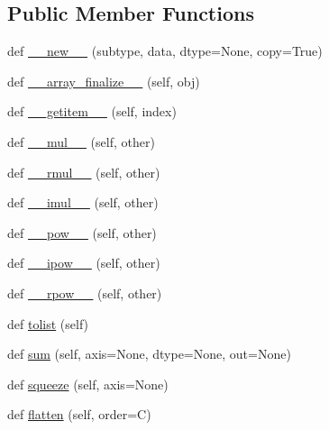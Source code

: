 \subsection*{Public Member Functions}
\begin{DoxyCompactItemize}
\item 
def \hyperlink{classnumpy_1_1matrixlib_1_1defmatrix_1_1matrix_ac27a960e1f347f1c668370b422168e2b}{\+\_\+\+\_\+new\+\_\+\+\_\+} (subtype, data, dtype=None, copy=True)
\item 
def \hyperlink{classnumpy_1_1matrixlib_1_1defmatrix_1_1matrix_a62da679c69d703e990df2a601d58d136}{\+\_\+\+\_\+array\+\_\+finalize\+\_\+\+\_\+} (self, obj)
\item 
def \hyperlink{classnumpy_1_1matrixlib_1_1defmatrix_1_1matrix_ac3c83aa69aecf2e2cb76154da9c4a88f}{\+\_\+\+\_\+getitem\+\_\+\+\_\+} (self, index)
\item 
def \hyperlink{classnumpy_1_1matrixlib_1_1defmatrix_1_1matrix_aa5b2cc49d1b2fda5e9806291892a1b87}{\+\_\+\+\_\+mul\+\_\+\+\_\+} (self, other)
\item 
def \hyperlink{classnumpy_1_1matrixlib_1_1defmatrix_1_1matrix_a9d6f3efe9eb68e1e26e29388434856bb}{\+\_\+\+\_\+rmul\+\_\+\+\_\+} (self, other)
\item 
def \hyperlink{classnumpy_1_1matrixlib_1_1defmatrix_1_1matrix_a82c2b045ec670774f0b736a965db2c5c}{\+\_\+\+\_\+imul\+\_\+\+\_\+} (self, other)
\item 
def \hyperlink{classnumpy_1_1matrixlib_1_1defmatrix_1_1matrix_a97af47d2917e0bc38f9cb21772b3b94c}{\+\_\+\+\_\+pow\+\_\+\+\_\+} (self, other)
\item 
def \hyperlink{classnumpy_1_1matrixlib_1_1defmatrix_1_1matrix_a179892b1bde83872c87434f7a32ff017}{\+\_\+\+\_\+ipow\+\_\+\+\_\+} (self, other)
\item 
def \hyperlink{classnumpy_1_1matrixlib_1_1defmatrix_1_1matrix_ac69a29c73bd91b8b50c177606541365a}{\+\_\+\+\_\+rpow\+\_\+\+\_\+} (self, other)
\item 
def \hyperlink{classnumpy_1_1matrixlib_1_1defmatrix_1_1matrix_a0b029ac8531e8e8f8ceaf8e4ec80d53d}{tolist} (self)
\item 
def \hyperlink{classnumpy_1_1matrixlib_1_1defmatrix_1_1matrix_a94a04383a1d739afc5123f76181abe7b}{sum} (self, axis=None, dtype=None, out=None)
\item 
def \hyperlink{classnumpy_1_1matrixlib_1_1defmatrix_1_1matrix_a41337a248c9e72606e16b829380629a3}{squeeze} (self, axis=None)
\item 
def \hyperlink{classnumpy_1_1matrixlib_1_1defmatrix_1_1matrix_ad46e381ae69336b5185dd9d36508ab6a}{flatten} (self, order=\textquotesingle{}C\textquotesingle{})

\end{DoxyCompactItemize}
